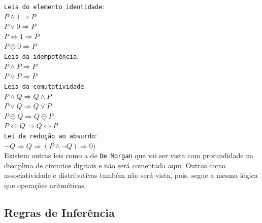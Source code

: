 \documentclass[12pt, onecolumn]{article}
\begin{document}
	\texttt{Leis do elemento identidade}:\\
	$P \land 1 \Rightarrow P$\\
	$P \lor 0 \Rightarrow P$\\
	$P \Leftrightarrow 1 \Rightarrow P$\\
	$P \oplus 0 \Rightarrow P$\\	
	\newline
	\texttt{Leis da idempotência}:\\
	$P \land P \Rightarrow P$\\
	$P \lor P \Rightarrow P$\\
	\newline
	\texttt{Leis da comutatividade}:\\
	$P \land Q \Rightarrow Q \land P$\\
	$P \lor Q \Rightarrow Q \lor P$\\
	$P \oplus Q \Rightarrow Q \oplus P$\\
	$P \Leftrightarrow Q \Rightarrow Q \Leftrightarrow P$\\
	\newline
	\texttt{Lei da redução ao absurdo}:\\
	$ -Q \Rightarrow Q \Rightarrow (P \land \lnot Q) \Rightarrow 0)$\\
	\newline
	Existem outras leis como a de \texttt{De Morgan} que vai ser vista com
	profundidade na disciplina de circuitos digitais e não será comentada aqui.
	Outras como associatividade e distributivas também não será vista, pois, 
	segue a mesma lógica que operações aritméticas.

		\subsection{\centering Regras de Inferência}
	
\end{document}
